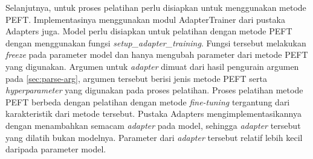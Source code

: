 Selanjutnya, untuk proses pelatihan perlu disiapkan untuk menggunakan metode PEFT. Implementasinya menggunakan modul AdapterTrainer dari pustaka Adapters juga. Model perlu disiapkan untuk pelatihan dengan metode PEFT dengan menggunakan fungsi \textit{setup\_adapter\_training}. Fungsi tersebut  melakukan \textit{freeze} pada parameter model dan hanya  mengubah parameter dari metode PEFT yang digunakan. Argumen untuk \textit{adapter} dimuat dari hasil pengurain argumen pada \ref{sec:parse-arg}, argumen tersebut berisi jenis metode PEFT serta \textit{hyperparameter} yang digunakan pada proses pelatihan. Proses pelatihan metode PEFT berbeda dengan pelatihan dengan metode \textit{fine-tuning} tergantung dari karakteristik dari metode tersebut. Pustaka Adapters mengimplementasikannya dengan menambahkan semacam \textit{adapter} pada model, sehingga \textit{adapter} tersebut yang dilatih bukan modelnya. Parameter dari \textit{adapter} tersebut relatif lebih kecil daripada parameter model.
